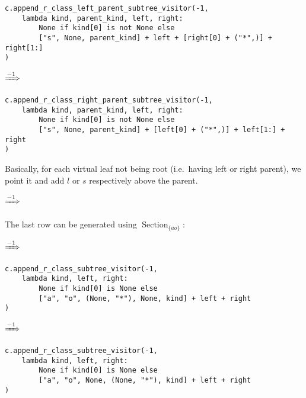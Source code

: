 \documentclass[final]{article}
\theoremstyle{definition}
\theoremstyle{definition}
\theoremstyle{remark}
\DeclareMathOperator{\tSection}{\text{Section}}
\newcommand{\includeinlinesvg}[2]{\begin{minipage}{#1\textwidth}\end{minipage}}
\newcommand{\includeinlinescaledsvg}[3]{\begin{minipage}{#1\textwidth}\begin{center}\end{center}\end{minipage}}
\begin{document}
\begin{lstlisting}
c.append_r_class_left_parent_subtree_visitor(-1,
    lambda kind, parent_kind, left, right:
        None if kind[0] is not None else
        ["s", None, parent_kind] + left + [right[0] + ("*",)] + right[1:]
)
\end{lstlisting}

\begin{center}
    \includeinlinescaledsvg{.4}{.7}{lambda__transformations__007a}%
    \(\xRightarrow{-1}\)%
    \includeinlinescaledsvg{.4}{.7}{lambda__transformations__007b}%
\end{center}

\begin{lstlisting}
c.append_r_class_right_parent_subtree_visitor(-1,
    lambda kind, parent_kind, left, right:
        None if kind[0] is not None else
        ["s", None, parent_kind] + [left[0] + ("*",)] + left[1:] + right
)
\end{lstlisting}

Basically, for each virtual leaf not being root (i.e.~having left or right parent), we point it and add \(l\) or \(s\) respectively above the parent.

\includeinlinesvg{.32}{lambda__trees_111__1_base}%
\(\xRightarrow{-1}\)%
\includeinlinesvg{.32}{lambda__trees_101__0}%
\includeinlinesvg{.32}{lambda__trees_112__0}%

The last row can be generated using \(\tSection_{\{ao\}}\):

\begin{center}
    \includeinlinescaledsvg{.4}{.7}{lambda__transformations__008a}%
    \(\xRightarrow{-1}\)%
    \includeinlinescaledsvg{.4}{.7}{lambda__transformations__008b}%
\end{center}

\begin{lstlisting}
c.append_r_class_subtree_visitor(-1,
    lambda kind, left, right:
        None if kind[0] is None else
        ["a", "o", (None, "*"), None, kind] + left + right
)
\end{lstlisting}

\begin{center}
    \includeinlinescaledsvg{.4}{.7}{lambda__transformations__009a}%
    \(\xRightarrow{-1}\)%
    \includeinlinescaledsvg{.4}{.7}{lambda__transformations__009b}%
\end{center}

\begin{lstlisting}
c.append_r_class_subtree_visitor(-1,
    lambda kind, left, right:
        None if kind[0] is None else
        ["a", "o", None, (None, "*"), kind] + left + right
)
\end{lstlisting}
\end{document}
